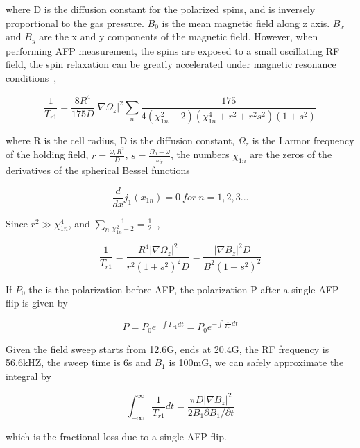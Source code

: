 where D is the diffusion constant for the polarized spins, and is inversely proportional to the gas pressure. $B_{0}$ is the mean magnetic field along z axis. $B_{x}$ and $B_{y}$ are the x and y components of the magnetic field. However, when performing AFP measurement, the spins are exposed to a small oscillating RF field, the spin relaxation can be greatly accelerated under magnetic resonance conditions~\cite{PhysRevA.38.5092},

\begin{equation}
\frac{1}{T_{r1}} = \frac{8R^{4}}{175D}|\nabla \Omega_{z}|^{2}\sum_{n} \frac{175}{4(\chi_{1n}^{2}-2)(\chi_{1n}^{4}+r^{2}+r^{2}s^{2})(1+s^{2})}
\end{equation}

where R is the cell radius, D is the diffusion constant, $\Omega_{z}$ is the Larmor frequency of the holding field, $r=\frac{\omega_{r}R^{2}}{D}$, $s=\frac{\Omega_{0}-\omega}{\omega_{r}}$, the numbers $\chi_{1n}$ are the zeros of the derivatives of the spherical Bessel functions

\begin{equation}
\frac{d}{dx}j_{1}(x_{1n})=0~for~n=1,2,3...
\end{equation}

Since $r^{2}\gg \chi_{1n}^{4}$, and $\sum_{n}\frac{1}{\chi_{1n}^{2}-2}=\frac{1}{2}$~\cite{PhysRevA.37.2877},

\begin{equation}
\frac{1}{T_{r1}}=\frac{R^{4}|\nabla\Omega_{z}|^{2}}{r^{2}(1+s^{2})^{2}D}=\frac{|\nabla B_{z}|^{2}D}{B^{2}(1+s^{2})^2}
\end{equation}

If $P_{0}$ the is the polarization before AFP, the polarization P after a single AFP flip is given by 

\begin{equation}
P=P_{0}e^{-\int \Gamma_{r1} dt}=P_{0}e^{-\int \frac{1}{T_{r1}}dt}
\end{equation}

Given the field sweep starts from 12.6G, ends at 20.4G, the RF frequency is 56.6kHZ, the sweep time is 6s and $B_{1}$ is 100mG, we can safely approximate the integral by 

\begin{equation}
\int_{-\infty}^{\infty} \frac{1}{T_{r1}}dt=\frac{\pi D|\nabla B_{z}|^{2}}{2B_{1}\partial B_{1}/\partial t}
\end{equation}

which is the fractional loss due to a single AFP flip.

